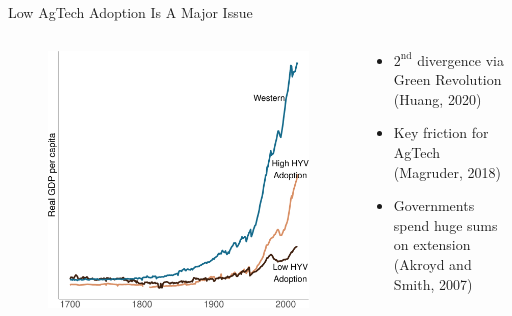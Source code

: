 \documentclass[
  ignorenonframetext,
]{beamer}
\providecommand{\tightlist}{%
  \setlength{\itemsep}{0pt}\setlength{\parskip}{0pt}}\usepackage{longtable,booktabs,array}
\begin{document}
\begin{frame}{Low AgTech Adoption Is A Major Issue}
\protect\hypertarget{low-agtech-adoption-is-a-major-issue}{}
\begin{columns}[T]
\begin{column}{0.55\textwidth}
\begin{figure}

\hfill{} \includegraphics{presentation_lori_files/figure-beamer/unnamed-chunk-2-1.pdf}

\end{figure}
\end{column}

\begin{column}{0.35\textwidth}
\begin{itemize}[<+->]
\tightlist
\item
  \(2^{\text{nd}}\) divergence via Green Revolution (Huang, 2020)
\end{itemize}

\begin{itemize}[<+->]
\tightlist
\item
  Key friction for AgTech (Magruder, 2018)
\end{itemize}

\begin{itemize}[<+->]
\tightlist
\item
  Governments spend huge sums on extension (Akroyd and Smith, 2007)
\end{itemize}
\end{column}
\end{columns}
\end{frame}
\end{document}
